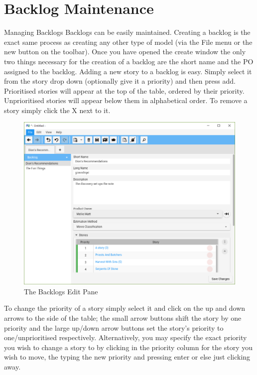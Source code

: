 \section{Backlog Maintenance}

Managing Backlogs
\newline\newline
Backlogs can be easily maintained. Creating a backlog is the exact same process as creating any other type of model (via the File menu or the new button on the toolbar). Once you have opened the create window the only two things necessary for the creation of a backlog are the short name and the PO assigned to the backlog.
\newline
Adding a new story to a backlog is easy. Simply select it from the story drop down (optionally give it a priority) and then press add. Prioritised stories will appear at the top of the table, ordered by their priority. Unprioritised stories will appear below them in alphabetical order. To remove a story simply click the X next to it.

\begin{figure}[H]
\centering
\includegraphics[width=\textwidth]{images/screenshots/backlogs.PNG}
\caption{The Backlogs Edit Pane}
\label{fig:new_project}
\end{figure}

\bigskip
To change the priority of a story simply select it and click on the up and down arrows to the side of the table; the small arrow buttons shift the story by one priority and the large up/down arrow buttons set the story's priority to one/unprioritised respectively. Alternatively, you may specify the exact priority you wish to change a story to by clicking in the priority column for the story you wish to move, the typing the new priority and pressing enter or else just clicking away.

